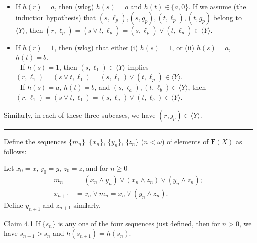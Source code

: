 {\begin{itemize}
  \item If $h(r) = a$, then (wlog) $h(s) = a$ and $h(t) \in \{a, 0\}$.  If we assume (the induction hypothesis) that $(s, \ell_p), (s, g_p), (t, \ell_p), (t, g_p)$ belong to $\langle Y \rangle$, then $(r, \ell_p) = (s \vee t, \ell_p) =  (s, \ell_p) \vee (t, \ell_p) \in \langle Y \rangle$. 

  \item If $h(r) = 1$, then (wlog) that either (i) $h(s) = 1$, or (ii) $h(s) = a$, $h(t)=b$.\\
  - If $h(s) = 1$, then $(s, \ell_1) \in \langle Y \rangle$ implies 
  $(r, \ell_1) = (s \vee t, \ell_1) =  (s, \ell_1) \vee (t, \ell_p) \in \langle Y \rangle$.\\
  - If $h(s) = a$, $h(t) = b$, and
  $(s, \ell_a), (t, \ell_b) \in \langle Y \rangle$, then
  $(r, \ell_1) = (s \vee t, \ell_1) =  (s, \ell_a) \vee (t, \ell_b) \in \langle Y \rangle$.

  \end{itemize}
Similarly, in each of these three subcases, we have $(r, g_p) \in \langle Y \rangle$.


\bigskip

\hrule


\bigskip


Define the sequences $\{m_n\}$, $\{x_n\}$, $\{y_n\}$, $\{z_n\}$ ($n< \omega$) of elements of $\mathbf{F}(X)$ as follows: 

Let  $x_0 = x$, $y_0 = y$, $z_0 = z$, and for $n\geqslant 0$, 
\begin{align*}
  m_n &= (x_n \wedge y_n) \vee (x_n \wedge z_n) \vee (y_n \wedge z_n);\\
  x_{n+1} &= x_n\vee m_n = x_n \vee (y_n \wedge z_n).
\end{align*}
Define $y_{n+1}$ and $z_{n+1}$ similarly.

\bigskip

\noindent \underline{Claim 4.1} If $\{s_n\}$ is any one of the four sequences just defined, then for $n>0$, we have $s_{n+1} > s_n$ and $h(s_{n+1}) = h(s_n)$.

\medskip


}
